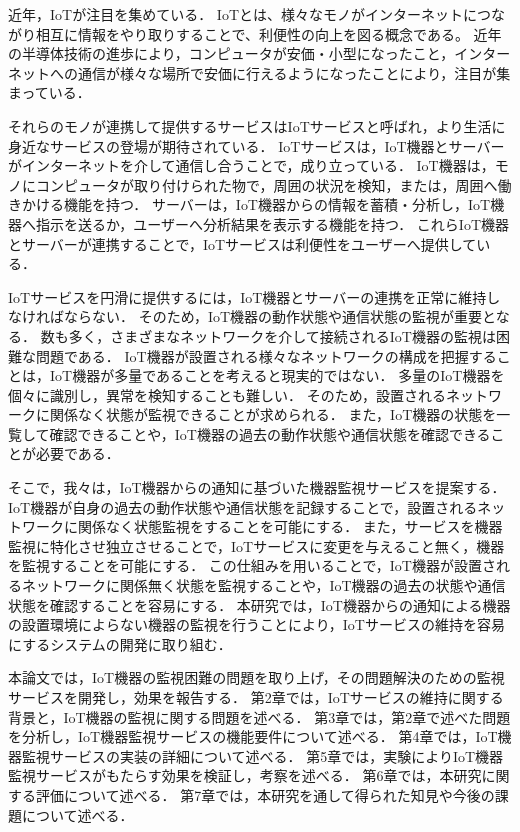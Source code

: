 
近年，IoTが注目を集めている．
IoTとは、様々なモノがインターネットにつながり相互に情報をやり取りすることで、利便性の向上を図る概念である。
近年の半導体技術の進歩により，コンピュータが安価・小型になったこと，インターネットへの通信が様々な場所で安価に行えるようになったことにより，注目が集まっている．
\medskip

それらのモノが連携して提供するサービスはIoTサービスと呼ばれ，より生活に身近なサービスの登場が期待されている．
IoTサービスは，IoT機器とサーバーがインターネットを介して通信し合うことで，成り立っている．
IoT機器は，モノにコンピュータが取り付けられた物で，周囲の状況を検知，または，周囲へ働きかける機能を持つ．
サーバーは，IoT機器からの情報を蓄積・分析し，IoT機器へ指示を送るか，ユーザーへ分析結果を表示する機能を持つ．
これらIoT機器とサーバーが連携することで，IoTサービスは利便性をユーザーへ提供している．
\medskip

IoTサービスを円滑に提供するには，IoT機器とサーバーの連携を正常に維持しなければならない．
そのため，IoT機器の動作状態や通信状態の監視が重要となる．
数も多く，さまざまなネットワークを介して接続されるIoT機器の監視は困難な問題である．
IoT機器が設置される様々なネットワークの構成を把握することは，IoT機器が多量であることを考えると現実的ではない．
多量のIoT機器を個々に識別し，異常を検知することも難しい．
そのため，設置されるネットワークに関係なく状態が監視できることが求められる．
また，IoT機器の状態を一覧して確認できることや，IoT機器の過去の動作状態や通信状態を確認できることが必要である．
\medskip

そこで，我々は，IoT機器からの通知に基づいた機器監視サービスを提案する．
IoT機器が自身の過去の動作状態や通信状態を記録することで，設置されるネットワークに関係なく状態監視をすることを可能にする．
また，サービスを機器監視に特化させ独立させることで，IoTサービスに変更を与えること無く，機器を監視することを可能にする．
この仕組みを用いることで，IoT機器が設置されるネットワークに関係無く状態を監視することや，IoT機器の過去の状態や通信状態を確認することを容易にする．
本研究では，IoT機器からの通知による機器の設置環境によらない機器の監視を行うことにより，IoTサービスの維持を容易にするシステムの開発に取り組む．
\medskip

本論文では，IoT機器の監視困難の問題を取り上げ，その問題解決のための監視サービスを開発し，効果を報告する．
第2章では，IoTサービスの維持に関する背景と，IoT機器の監視に関する問題を述べる．
第3章では，第2章で述べた問題を分析し，IoT機器監視サービスの機能要件について述べる．
第4章では，IoT機器監視サービスの実装の詳細について述べる．
第5章では，実験によりIoT機器監視サービスがもたらす効果を検証し，考察を述べる．
第6章では，本研究に関する評価について述べる．
第7章では，本研究を通して得られた知見や今後の課題について述べる．





